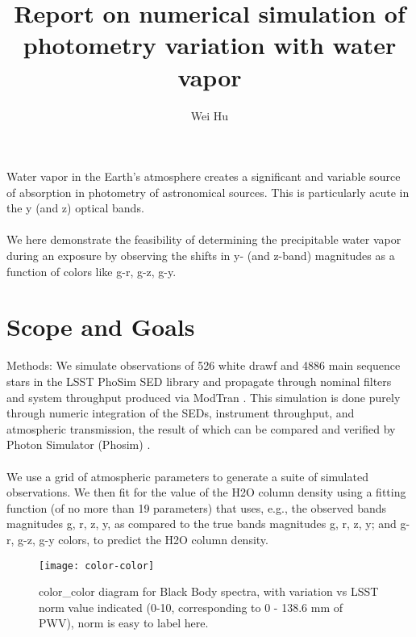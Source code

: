 \documentclass[a4paper,12pt]{article}
\begin{document}
\title{Report on numerical simulation of photometry variation with water vapor}
\author{Wei Hu}
\maketitle

\justify

Water vapor in the Earth's atmosphere creates a significant and variable source of absorption in photometry of astronomical sources.  This is particularly acute in the y (and z) optical bands.
\paragraph{}

We here demonstrate the feasibility of determining the precipitable water vapor during an exposure by observing the shifts in y- (and z-band) magnitudes as a function of colors like g-r, g-z, g-y.




\clearpage
\tableofcontents
\clearpage

\section{Scope and Goals}


Methods: We simulate observations of 526 white drawf and 4886 main sequence stars in the LSST PhoSim SED library and propagate through nominal filters and system throughput produced via ModTran .  This simulation is done purely through numeric integration of the SEDs, instrument throughput, and atmospheric transmission, the result of which can be compared and verified by Photon Simulator (Phosim) \cite{manual}.
\paragraph{}
We use a grid of atmospheric parameters to generate a suite of simulated observations.  We then fit for the value of the H2O column density using a fitting function (of no more than 19 parameters) that uses, e.g., the observed bands magnitudes g, r, z, y, as compared to the true bands magnitudes g, r, z, y; and g-r, g-z, g-y colors,  to predict the H2O column density.

\graphicspath{{/home/bruno/users/weh40/sims_phosim/data/SEDs/SEDs/back/4thrun/}}
\begin{figure}[h!]
\begin{center}
\texttt{[image: color-color]}
\caption{color\_color diagram for Black Body spectra, with variation vs LSST norm value indicated (0-10, corresponding to 0 - 138.6 mm of PWV), norm is easy to label here.}
\end{center}
\end{figure}
\end{document}
